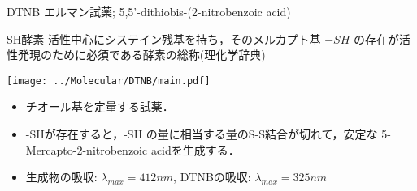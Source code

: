 \documentclass[handout,xelatex,ja=standard,jafont=hiragino-pron,unicode,30pt]{beamer}
\begin{document}
\begin{frame}[t]{DTNB エルマン試薬; 5,5'-dithiobis-(2-nitrobenzoic acid)}
\begin{block}{SH酵素}
活性中心にシステイン残基を持ち，そのメルカプト基 $-SH$ の存在が活性発現のために必須である酵素の総称(理化学辞典)
\end{block}
\centering
\vspace{-0.2cm}
\texttt{[image: ../Molecular/DTNB/main.pdf]}
\begin{itemize}
\vspace{-0.2cm}
\item チオール基を定量する試薬．
\item -SHが存在すると，-SH の量に相当する量のS-S結合が切れて，安定な 5-Mercapto-2-nitrobenzoic acidを生成する．
\item 生成物の吸収: $\lambda_{max}=412nm$, DTNBの吸収: $\lambda_{max}=325nm$
\end{itemize}
\end{frame}
\end{document}
